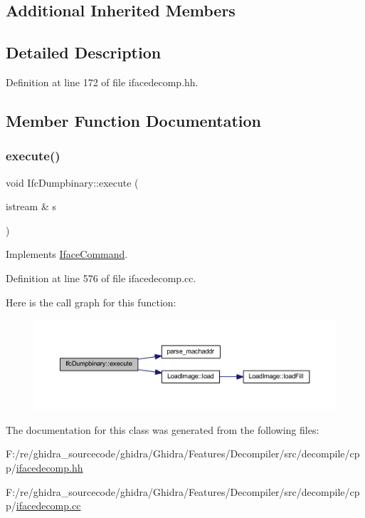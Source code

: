 \subsection*{Additional Inherited Members}


\subsection{Detailed Description}


Definition at line 172 of file ifacedecomp.\+hh.



\subsection{Member Function Documentation}
\mbox{\label{class_ifc_dumpbinary_a1a4fb5637d0c8792ed2aaf7615f7da00}} 
\subsubsection{\texorpdfstring{execute()}{execute()}}
{\footnotesize\ttfamily void Ifc\+Dumpbinary\+::execute (\begin{DoxyParamCaption}\item[{istream \&}]{s }\end{DoxyParamCaption})\hspace{0.3cm}{\ttfamily [virtual]}}



Implements \mbox{\hyperlink{class_iface_command_af10e29cee2c8e419de6efe9e680ad201}{Iface\+Command}}.



Definition at line 576 of file ifacedecomp.\+cc.

Here is the call graph for this function\+:
\nopagebreak
\begin{figure}[H]
\begin{center}
\leavevmode
\includegraphics[width=350pt]{class_ifc_dumpbinary_a1a4fb5637d0c8792ed2aaf7615f7da00_cgraph}
\end{center}
\end{figure}


The documentation for this class was generated from the following files\+:\begin{DoxyCompactItemize}
\item 
F\+:/re/ghidra\+\_\+sourcecode/ghidra/\+Ghidra/\+Features/\+Decompiler/src/decompile/cpp/\mbox{\hyperlink{ifacedecomp_8hh}{ifacedecomp.\+hh}}\item 
F\+:/re/ghidra\+\_\+sourcecode/ghidra/\+Ghidra/\+Features/\+Decompiler/src/decompile/cpp/\mbox{\hyperlink{ifacedecomp_8cc}{ifacedecomp.\+cc}}\end{DoxyCompactItemize}
